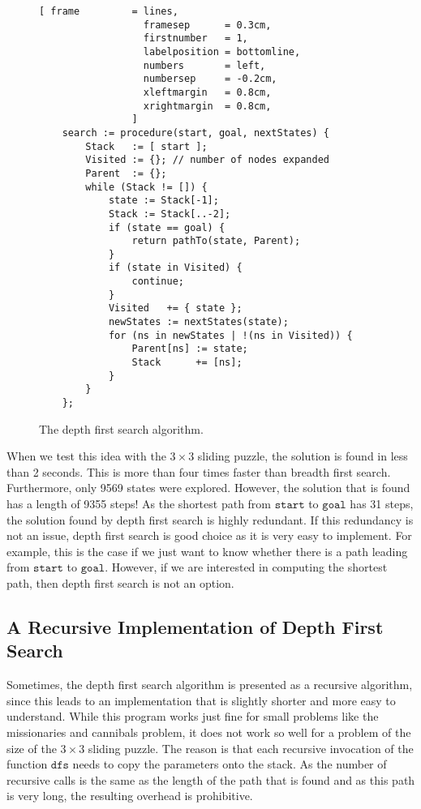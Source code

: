 \begin{figure}[!ht]
\centering
\begin{Verbatim}[ frame         = lines, 
                  framesep      = 0.3cm, 
                  firstnumber   = 1,
                  labelposition = bottomline,
                  numbers       = left,
                  numbersep     = -0.2cm,
                  xleftmargin   = 0.8cm,
                  xrightmargin  = 0.8cm,
                ]
    search := procedure(start, goal, nextStates) {
        Stack   := [ start ];
        Visited := {}; // number of nodes expanded
        Parent  := {};
        while (Stack != []) {
            state := Stack[-1];
            Stack := Stack[..-2];
            if (state == goal) {
                return pathTo(state, Parent);
            }
            if (state in Visited) {
                continue;
            }
            Visited   += { state };
            newStates := nextStates(state);
            for (ns in newStates | !(ns in Visited)) { 
                Parent[ns] := state;
                Stack      += [ns];
            }
        }
    };
\end{Verbatim}
\vspace*{-0.3cm}
\caption{The depth first search algorithm.}
\label{fig:depth-first-search.stlx}
\end{figure}
When we test this idea with the $3 \times 3$ sliding puzzle, the solution is found in less than 2
seconds.  This is more than four times faster than breadth first search.  Furthermore, only 9569
states were explored.  However, the solution that is found has a length of 9355 steps!  As the
shortest path from $\mathtt{start}$ to $\mathtt{goal}$ has 31 steps, the solution found by depth
first search is highly redundant.  If this redundancy is not an issue, depth first search is good
choice as it is very easy to implement.  For example, this is the case if we just want to know
whether there is a path leading from $\mathtt{start}$ to $\mathtt{goal}$.  However, if we are
interested in computing the shortest path, then depth first search is not an option.

\subsection{A Recursive Implementation of Depth First Search}
Sometimes, the depth first search algorithm is presented as a recursive algorithm, since this leads
to an implementation that is slightly shorter and more easy to understand.  While this program works
just fine for small problems like the missionaries and cannibals problem, it does not work so well
for a problem of the size of the $3 \times 3$ sliding puzzle.  The reason is that each recursive
invocation of the function $\mathtt{dfs}$ needs to copy the parameters onto the stack.  As the number of
recursive calls is the same as the length of the path that is found and as this path is very long, 
the resulting overhead is prohibitive.

